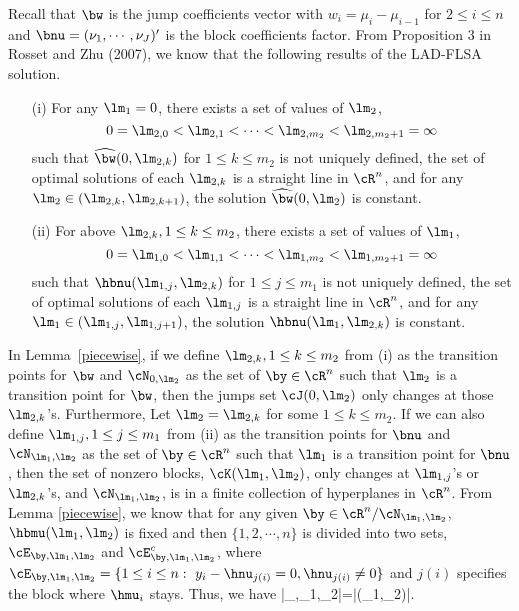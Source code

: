 \documentclass[12pt]{article}
\begin{document}
Recall that $\bw$ is the jump coefficients vector with $w_i=\mu_i-\mu_{i-1}$ for $2\le i\le n$
and $\bnu=(\nu_1,\cdots, \nu_J)'$ is the block coefficients factor.
 From Proposition 3 in Rosset and Zhu (2007), we know that the following results of the LAD-FLSA solution.
 \begin{lemma}\label{piecewise}
 \begin{itemize}
\item[(i)] For any $\lm_1=0$, there exists a set of values of $\lm_2$,
$$0=\lm_{2,0}<\lm_{2,1}<\cdots<\lm_{2,m_2}<\lm_{2,m_2+1}=\infty$$ such
that $\widehat \bw(0, \lm_{2,k})$ for $1\le k\le m_2$ is not uniquely defined, the set of optimal solutions of
each $\lm_{2,k}$  is a straight line in $\cR^n$, and for any $\lm_2\in (\lm_{2,k}, \lm_{2,k+1})$, the
solution  $\widehat \bw(0, \lm_2)$ is constant.
\item[(ii)] For above $\lm_{2,k}, 1\le k\le m_2$,  there exists a set of values of $\lm_1$,
$$0=\lm_{1,0}<\lm_{1,1}<\cdots<\lm_{1,m_2}<\lm_{1,m_2+1}=\infty$$ such
that $\hbnu(\lm_{1,j}, \lm_{2,k})$ for $1\le j\le m_1$ is not uniquely defined,
the set of optimal solutions of
each $\lm_{1,j}$ is a straight line in $\cR^n$, and for any $\lm_1\in (\lm_{1,j}, \lm_{1,j+1})$, the
solution  $\hbnu(\lm_{1}, \lm_{2,k})$ is constant.
\end{itemize}
\end{lemma}
In Lemma~\ref{piecewise}, if we define  $\lm_{2,k}, 1\le k \le m_2$ from  (i)  as the transition points for $\bw$ and
 $\cN_{0, \lm_2}$ as the set of
 $\by\in \cR^n$ such that $\lm_{2}$ is a transition point for $\bw$,
 then the jumps set  $\cJ(0,\lm_2)$ only changes at those $\lm_{2,k}$'s.
Furthermore, Let $\lm_2=\lm_{2,k}$ for some $1\le k \le m_2$.
 If we can also define $\lm_{1,j}, 1\le j \le m_1$ from (ii) as the transition points for $\bnu$ and
 $\cN_{\lm_{1}, \lm_{2}}$ as the set of
 $\by\in \cR^n$ such that $\lm_{1}$ is a transition point for $\bnu$,
then the set of nonzero blocks,  $\cK(\lm_{1},\lm_{2})$,  only changes at  $\lm_{1,j}$'s or $\lm_{2,k}$'s,
and $\cN_{\lm_1,\lm_2}$, is in a finite collection of hyperplanes in $\cR^n$.
From Lemma \ref{piecewise}, we know that for any given
$\by\in\cR^n/\cN_{\lm_{1}, \lm_2}$, $\hbmu(\lm_{1},\lm_2)$ is fixed and then $\{1, 2,
\cdots, n\}$ is divided into two sets, $\cE_{\by,\lm_{1},\lm_2}$ and
$\cE_{\by,\lm_{1},\lm_2}^c$, where $\cE_{\by,\lm_{1},\lm_2}=\{1\le i\le n:~ y_i-\hnu_{j(i)}=0, \hnu_{j(i)}\neq 0\}
$
and $j(i)$ specifies the block where $\hmu_i$ stays.
Thus, we have
 |\cE_{\by,\lm_1,\lm_2}|=|\cK(\lm_1,\lm_2)|.
\eel
\end{document}
